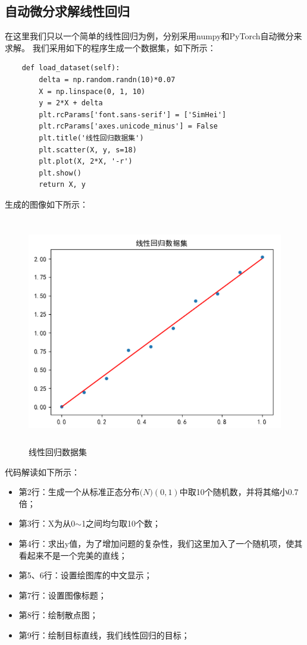 \documentclass[UTF8]{article}
\begin{document}
\subsection{自动微分求解线性回归}
在这里我们只以一个简单的线性回归为例，分别采用numpy和PyTorch自动微分来求解。\newline
我们采用如下的程序生成一个数据集，如下所示：
\begin{lstlisting}
    def load_dataset(self):
        delta = np.random.randn(10)*0.07
        X = np.linspace(0, 1, 10)
        y = 2*X + delta
        plt.rcParams['font.sans-serif'] = ['SimHei']
        plt.rcParams['axes.unicode_minus'] = False
        plt.title('线性回归数据集')
        plt.scatter(X, y, s=18)
        plt.plot(X, 2*X, '-r')
        plt.show()
        return X, y
\end{lstlisting}
生成的图像如下所示：
\begin{figure}[H]
	\caption{线性回归数据集}
	\label{f000011}
	\centering
	\includegraphics[height=10cm]{images/f000011}
\end{figure}
代码解读如下所示：
\begin{itemize}
\item 第2行：生成一个从标准正态分布$\mathcal(N)(0,1)$中取10个随机数，并将其缩小0.7倍；
\item 第3行：X为从0$\sim$1之间均匀取10个数；
\item 第4行：求出y值，为了增加问题的复杂性，我们这里加入了一个随机项，使其看起来不是一个完美的直线；
\item 第5、6行：设置绘图库的中文显示；
\item 第7行：设置图像标题；
\item 第8行：绘制散点图；
\item 第9行：绘制目标直线，我们线性回归的目标；
\end{itemize}
\end{document}
